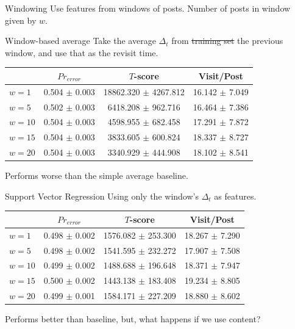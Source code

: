 \documentclass[12pt]{presentation}
\begin{document}
\begin{frame}{Windowing}
Use features from windows of posts. Number of posts in window given by $w$.
\begin{center}

\end{center}
\end{frame}


\begin{frame}{Window-based average}
	Take the average $\Delta_t$ from \sout{training set} the previous window, and use that as the revisit time.
	\begin{center}
		\footnotesize
		\begin{tabular}{ | l | c | c | c | }
			\hline
		& $Pr_{error}$		  & $T$-score			   &	Visit/Post\\
			\hline
 $w = 1$ &	0.504 $\pm$ 0.003 &	18862.320 $\pm$ 4267.812 &	16.142 $\pm$ 7.049 \\
 $w = 5$ &	0.502 $\pm$ 0.003 &	6418.208 $\pm$ 962.716 &  	16.464 $\pm$ 7.386 \\
 $w = 10$ &	0.504 $\pm$ 0.003 &	4598.955 $\pm$ 682.458 &  	17.291 $\pm$ 7.872 \\
$w = 15$ &	0.504 $\pm$ 0.003 &	3833.605 $\pm$ 600.824 &  	18.337 $\pm$ 8.727 \\
\rowcolor{green}
$w = 20$ &	0.504 $\pm$ 0.003 &	3340.929 $\pm$ 444.908 &  	18.102 $\pm$ 8.541 \\
			\hline
		\end{tabular}
	\end{center}
	Performs worse than the simple average baseline.

\end{frame}

\begin{frame}{Support Vector Regression}
		Using only the window's $\Delta_t$ as features.
	\begin{center}
		\footnotesize
		\begin{tabular}{ | l | c | c | c | }
			\hline
		& $Pr_{error}$		  & $T$-score			   &	Visit/Post\\
			\hline
  $w=1$ &	0.498 $\pm$ 0.002 &	1576.082 $\pm$ 253.300 &  	18.267 $\pm$ 7.290 \\
  $w=5$ &	0.498 $\pm$ 0.002 &	1541.595 $\pm$ 232.272 &  	17.907 $\pm$ 7.508 \\
 $w=10$ &	0.499 $\pm$ 0.002 &	1488.688 $\pm$ 196.648 &  	18.371 $\pm$ 7.947 \\
\rowcolor{green}
 $w=15$ &	0.500 $\pm$ 0.002 &	1443.138 $\pm$ 183.408 &  	19.234 $\pm$ 8.805 \\
 $w=20$ &	0.499 $\pm$ 0.001 &	1584.171 $\pm$ 227.209 &  	18.880 $\pm$ 8.602 	\\
			\hline
		\end{tabular}
	\end{center}
	Performs better than baseline, but, what happens if we use content?
\end{frame}
\end{document}
